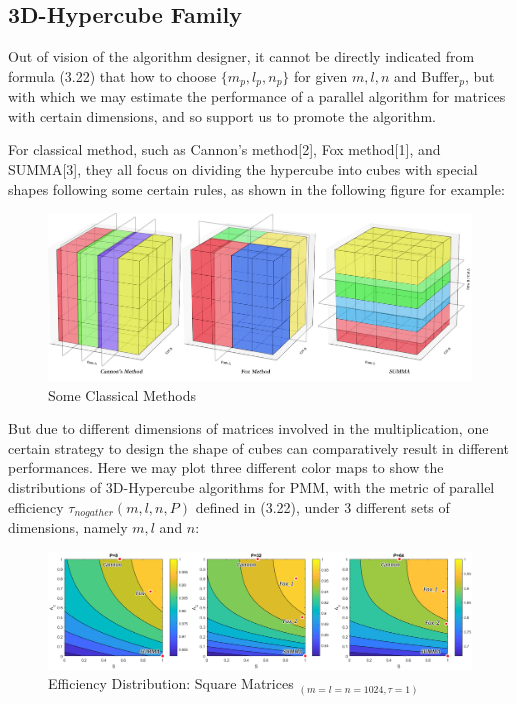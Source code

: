 \documentclass{amsart}
\theoremstyle{definition}
\theoremstyle{remark}
\numberwithin{equation}{section}
\begin{document}
\subsection{3D-Hypercube Family}
Out of vision of the algorithm designer, it cannot be directly indicated from formula (3.22) that how to choose $\{m_p,l_p,n_p\}$ for given $m,l,n$ and $\text{Buffer}_p$, but with which we may estimate the performance of a parallel algorithm for matrices with certain dimensions, and so support us to promote the algorithm.\par
For classical method, such as Cannon’s method[2], Fox method[1], and SUMMA[3], they all focus on dividing the hypercube into cubes with special shapes following some certain rules, as shown in the following figure for example:
\begin{figure}[h]
	\includegraphics[scale=0.2]{Figures/3DAlg.jpg}
	\caption{Some Classical Methods}
\end{figure}
\par
	But due to different dimensions of matrices involved in the multiplication, one certain strategy to design the shape of cubes can comparatively result in different performances. Here we may plot three different color maps to show the distributions of 3D-Hypercube algorithms for PMM, with the metric of parallel efficiency $\tau_{no gather}(m,l,n,P)$ defined in (3.22), under 3 different sets of dimensions, namely $m,l$ and $n$:
\begin{figure}[h]
	\includegraphics[scale=0.35]{Figures/Regular.png}
	\caption{Efficiency Distribution: Square Matrices $_{(m=l=n=1024,\tau=1)}$}
\end{figure}
\end{document}
